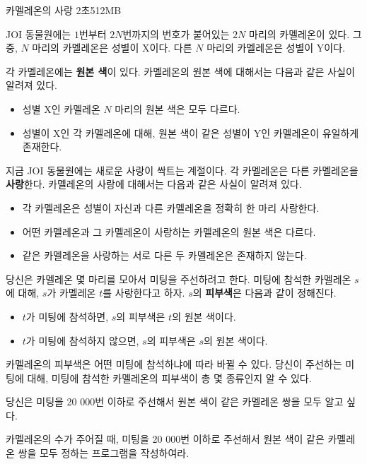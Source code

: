 \begin{problem}{카멜레온의 사랑}
	{}{}
	{2초}{512MB}{}
	
	JOI 동물원에는 $1$번부터 $2N$번까지의 번호가 붙어있는 $2N$ 마리의 카멜레온이 있다. 그 중, $N$ 마리의 카멜레온은 성별이 X이다. 다른 $N$ 마리의 카멜레온은 성별이 Y이다.
	
	각 카멜레온에는 \textbf{원본 색}이 있다. 카멜레온의 원본 색에 대해서는 다음과 같은 사실이 알려져 있다.
	
	\begin{itemize}
		\item 성별 X인 카멜레온 $N$ 마리의 원본 색은 모두 다르다.
		\item 성별이 X인 각 카멜레온에 대해, 원본 색이 같은 성별이 Y인 카멜레온이 유일하게 존재한다.
	\end{itemize}
	
	지금 JOI 동물원에는 새로운 사랑이 싹트는 계절이다. 각 카멜레온은 다른 카멜레온을 \textbf{사랑}한다. 카멜레온의 사랑에 대해서는 다음과 같은 사실이 알려져 있다.
	
	\begin{itemize}
		\item 각 카멜레온은 성별이 자신과 다른 카멜레온을 정확히 한 마리 사랑한다.
		\item 어떤 카멜레온과 그 카멜레온이 사랑하는 카멜레온의 원본 색은 다르다.
		\item 같은 카멜레온을 사랑하는 서로 다른 두 카멜레온은 존재하지 않는다.
	\end{itemize}

	당신은 카멜레온 몇 마리를 모아서 미팅을 주선하려고 한다. 미팅에 참석한 카멜레온 $s$에 대해, $s$가 카멜레온 $t$를 사랑한다고 하자. $s$의 \textbf{피부색}은 다음과 같이 정해진다.
	
	\begin{itemize}
		\item $t$가 미팅에 참석하면, $s$의 피부색은 $t$의 원본 색이다.
		\item $t$가 미팅에 참석하지 않으면, $s$의 피부색은 $s$의 원본 색이다.
	\end{itemize}

	카멜레온의 피부색은 어떤 미팅에 참석하냐에 따라 바뀔 수 있다. 당신이 주선하는 미팅에 대해, 미팅에 참석한 카멜레온의 피부색이 총 몇 종류인지 알 수 있다.
	
	당신은 미팅을 20 000번 이하로 주선해서 원본 색이 같은 카멜레온 쌍을 모두 알고 싶다.
	
	카멜레온의 수가 주어질 때, 미팅을 20 000번 이하로 주선해서 원본 색이 같은 카멜레온 쌍을 모두 정하는 프로그램을 작성하여라.
	

\end{problem}

